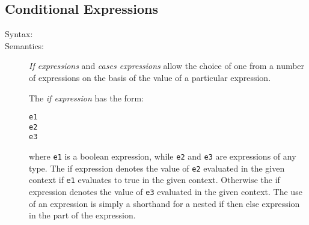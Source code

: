 \documentclass[\pformat,12pt]{article}
\begin{document}
\subsection{Conditional Expressions}
\label{if-exp} \label{cases-exp}
\begin{description}
\item[Syntax:]


                     




\item[Semantics:] {\it If expressions} and {\it cases expressions}
  allow the choice of one from a number of expressions on the basis of
  the value of a particular expression.

  The {\it if expression} has the form:
  \begin{alltt}
     e1
     e2
     e3
  \end{alltt}
  where {\tt e1} is a boolean expression, while {\tt e2} and {\tt e3}
  are expressions of any type. The if expression denotes the value of
  {\tt e2} evaluated in the given context if {\tt e1} evaluates to
  true in the given context. Otherwise the if expression denotes the
  value of {\tt e3} evaluated in the given context. The use of an
   expression is simply a shorthand for a nested if then
  else expression in the  part of the expression.


\end{description}
\end{document}
